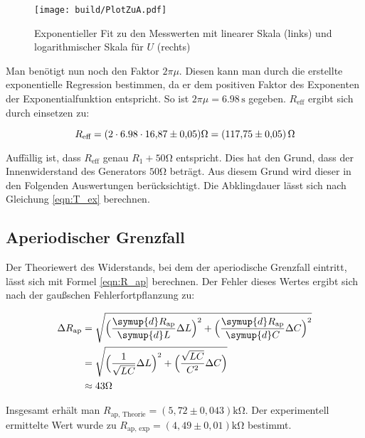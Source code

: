 \begin{figure}
  \centering
  \texttt{[image: build/PlotZuA.pdf]}
  \caption{Exponentieller Fit zu den Messwerten mit linearer Skala (links) und logarithmischer Skala für $U$ (rechts)}
  \label{fig:PlotZuA}
\end{figure}

Man benötigt nun noch den Faktor $2\pi\mu$. Diesen kann man durch die erstellte exponentielle Regression 
bestimmen, da er dem positiven Faktor des Exponenten der Exponentialfunktion entspricht. 
So ist $2\pi\mu = 6.98\,\unit{\second}$ gegeben.
$R_{\text{eff}}$ ergibt sich durch einsetzen zu:

\begin{equation*}
  R_{\text{eff}} = (2\cdot 6.98\cdot \num{16.87\pm 0.05}) \unit{\ohm} = (\num{117.75 \pm 0.05})\,\unit{\ohm}
\end{equation*}

Auffällig ist, dass $R_{\text{eff}}$ genau $R_1 + 50\unit{\ohm}$ entspricht. Dies hat den Grund, dass der Innenwiderstand des Generators
$50 \unit{\ohm}$ beträgt. Aus diesem Grund wird dieser in den Folgenden Auswertungen berücksichtigt.
Die Abklingdauer lässt sich nach Gleichung \eqref{eqn:T_ex} berechnen.

\subsection{Aperiodischer Grenzfall}
\label{subsec:AuswertungB}

Der Theoriewert des Widerstands, bei dem der aperiodische Grenzfall eintritt, lässt sich mit Formel \eqref{eqn:R_ap} berechnen.
Der Fehler dieses Wertes ergibt sich nach der gaußschen Fehlerfortpflanzung zu:

\begin{align*}
  \label{eqn:err_R_ap}
  \Delta R_{\text{ap}} &= \sqrt{\Bigl(\frac{\symup{d}R_{\text{ap}}}{\symup{d}L}\Delta L \Bigr)^2+\Bigl(\frac{\symup{d}R_{\text{ap}}}{\symup{d}C}\Delta C\Bigr)^2} \\
  &= \sqrt{\Bigl(\frac{1}{\sqrt{LC}}\Delta L\Bigr)^2+\Bigl(\frac{\sqrt{LC}}{C^2}\Delta C\Bigr)} \\
  &\approx 43 \unit{\ohm}
\end{align*}

Insgesamt erhält man $R_{\text{ap, Theorie}} = (5,72 \pm 0,043) \unit{\kilo\ohm}$. Der experimentell ermittelte Wert wurde 
zu $R_{\text{ap, exp}} = (4,49 \pm 0,01) \unit{\kilo\ohm}$ bestimmt.

